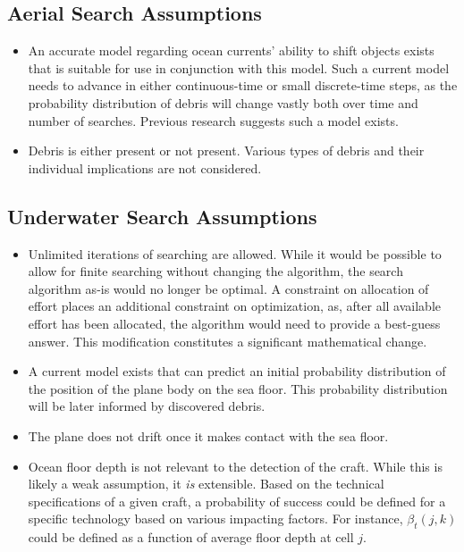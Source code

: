 \subsection{Aerial Search Assumptions}

\begin{itemize}
\item An accurate model regarding ocean currents' ability to shift objects exists that is suitable for use in conjunction with this model. Such a current model needs to advance in either continuous-time or small discrete-time steps, as the probability distribution of debris will change vastly both over time and number of searches. Previous research suggests such a model exists. 
\item Debris is either present or not present. Various types of debris and their individual implications are not considered. 
\end{itemize}

\subsection{Underwater Search Assumptions}

\begin{itemize}
\item Unlimited iterations of searching are allowed. While it would be possible to allow for finite searching without changing the algorithm, the search algorithm as-is would no longer be optimal. A constraint on allocation of effort places an additional constraint on optimization, as, after all available effort has been allocated, the algorithm would need to provide a best-guess answer. This modification constitutes a significant mathematical change.
\item A current model exists that can predict an initial probability distribution of the position of the plane body on the sea floor. This probability distribution will be later informed by discovered debris.
\item The plane does not drift once it makes contact with the sea floor.  
\item Ocean floor depth is not relevant to the detection of the craft. While this is likely a weak assumption, it \textit{is} extensible. Based on the technical specifications of a given craft, a probability of success could be defined for a specific technology based on various impacting factors. For instance, $\beta_t(j,k)$ could be defined as a function of average floor depth at cell $j$.
\end{itemize}